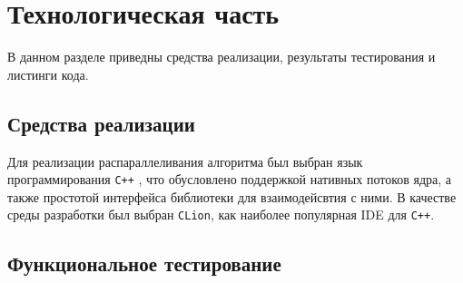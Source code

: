 \chapter{Технологическая часть}
В данном разделе приведны средства реализации, результаты тестирования и листинги кода.

\section{Средства реализации}

Для реализации распараллеливания алгоритма был выбран язык программирования \texttt{C++} \cite{cpp}, 
что обусловлено поддержкой нативных потоков ядра, а также простотой интерфейса библиотеки для взаимодейсвтия с ними. 
В качестве среды разработки был выбран \texttt{CLion}\cite{clion}, как наиболее популярная IDE для \texttt{C++}. 

\section{Функциональное тестирование}

